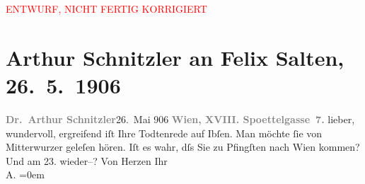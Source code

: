 
\begin{center}
            \textcolor{red}{ENTWURF, NICHT FERTIG KORRIGIERT}
                      \end{center}
            
         
         \newcommand{\erwaehntePersonen}{Personen: Henrik Ibsen, Friedrich Mitterwurzer, Felix Salten}
         \newcommand{\erwaehnteOrte}{Orte: Berlin, Wien}
         \newcommand{\erwaehnteWerke}{Werke: ?? [Totenrede an Ibsen]}
               \section[Arthur Schnitzler an Felix Salten, 26. 5. 1906]{ Arthur Schnitzler an Felix Salten, 26. 5. 1906}\nopagebreak{}\rehead{ }\begin{ledgroupsized}[t]{13cm}\normalsize\beginnumbering \toendnotes[C]{\smallbreak\pagebreak[2]} 
\toendnotes[C]{\smallbreak}\pstart
           \noindent{}{\pb}\textcolor{gray}{\textbf{Dr. Arthur Schnitzler}}\hfill 26. Mai 906\pend
           \pstart
           \textcolor{gray}{\textbf{Wien, XVIII.
                        Spoettelgasse 7.}}\pend
           \pstart
           lieber, wundervoll, ergreifend iſt Ihre Todtenrede auf Ibſen. Man möchte ſie von Mitterwurzer geleſen
               hören. \pend
           \pstart
           {\pb}Iſt es wahr, dſs Sie zu
                  Pfingſten nach Wien kommen? Und am
                  23. wieder–? \pend
           \pstart
           Von Herzen Ihr {\\[\baselineskip]}\spacefill\mbox{A.}\pend
           \leftskip=0em{}
         
         \endnumbering{}\end{ledgroupsized}\begin{anhang}\end{anhang}\newcommand{\dateiname}{L03006}\newcommand{\titel}{Arthur Schnitzler an Felix Salten, 26. 5. 1906}\newcommand{\editorInnen}{Martin Anton Müller und Laura Untner}
      